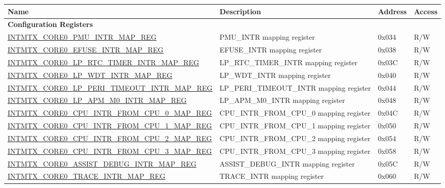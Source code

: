 \begin{longtable}{ | p{10cm} | p{10cm} | p{1.3cm} | p{1cm} | }
\hline\rowcolor{lightgray}
Name & Description &  Address & Access \\ \hline
\endhead
\multicolumn{4}{|l|}{\textbf{Configuration Registers}} \\ \hline

\hyperref[regdesc:INTMTXCORE0PMUINTRMAPREG]{INTMTX\_CORE0\_PMU\_INTR\_MAP\_REG} & PMU\_INTR mapping register & 0x034 & R/W  \\ \hline
\hyperref[regdesc:INTMTXCORE0EFUSEINTRMAPREG]{INTMTX\_CORE0\_EFUSE\_INTR\_MAP\_REG} & EFUSE\_INTR mapping register & 0x038 & R/W  \\ \hline
\hyperref[regdesc:INTMTXCORE0LPRTCTIMERINTRMAPREG]{INTMTX\_CORE0\_LP\_RTC\_TIMER\_INTR\_MAP\_REG} & LP\_RTC\_TIMER\_INTR mapping register & 0x03C & R/W  \\ \hline
\hyperref[regdesc:INTMTXCORE0LPWDTINTRMAPREG]{INTMTX\_CORE0\_LP\_WDT\_INTR\_MAP\_REG} & LP\_WDT\_INTR mapping register & 0x040 & R/W  \\ \hline
\hyperref[regdesc:INTMTXCORE0LPPERITIMEOUTINTRMAPREG]{INTMTX\_CORE0\_LP\_PERI\_TIMEOUT\_INTR\_MAP\_REG} & LP\_PERI\_TIMEOUT\_INTR mapping register & 0x044 & R/W  \\ \hline
\hyperref[regdesc:INTMTXCORE0LPAPMM0INTRMAPREG]{INTMTX\_CORE0\_LP\_APM\_M0\_INTR\_MAP\_REG} & LP\_APM\_M0\_INTR mapping register & 0x048 & R/W  \\ \hline
\hyperref[regdesc:INTMTXCORE0CPUINTRFROMCPU0MAPREG]{INTMTX\_CORE0\_CPU\_INTR\_FROM\_CPU\_0\_MAP\_REG} & CPU\_INTR\_FROM\_CPU\_0 mapping register & 0x04C & R/W  \\ \hline
\hyperref[regdesc:INTMTXCORE0CPUINTRFROMCPU1MAPREG]{INTMTX\_CORE0\_CPU\_INTR\_FROM\_CPU\_1\_MAP\_REG} & CPU\_INTR\_FROM\_CPU\_1 mapping register & 0x050 & R/W  \\ \hline
\hyperref[regdesc:INTMTXCORE0CPUINTRFROMCPU2MAPREG]{INTMTX\_CORE0\_CPU\_INTR\_FROM\_CPU\_2\_MAP\_REG} & CPU\_INTR\_FROM\_CPU\_2 mapping register & 0x054 & R/W  \\ \hline
\hyperref[regdesc:INTMTXCORE0CPUINTRFROMCPU3MAPREG]{INTMTX\_CORE0\_CPU\_INTR\_FROM\_CPU\_3\_MAP\_REG} & CPU\_INTR\_FROM\_CPU\_3 mapping register & 0x058 & R/W  \\ \hline
\hyperref[regdesc:INTMTXCORE0ASSISTDEBUGINTRMAPREG]{INTMTX\_CORE0\_ASSIST\_DEBUG\_INTR\_MAP\_REG} & ASSIST\_DEBUG\_INTR mapping register & 0x05C & R/W  \\ \hline
\hyperref[regdesc:INTMTXCORE0TRACEINTRMAPREG]{INTMTX\_CORE0\_TRACE\_INTR\_MAP\_REG} & TRACE\_INTR mapping register & 0x060 & R/W  \\ \hline

\end{longtable}

